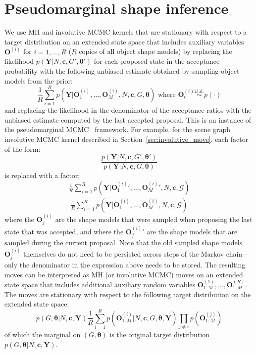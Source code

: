\section{Pseudomarginal shape inference}
\label{sec:pseudomarginal}

We use MH and involutive MCMC kernels that are stationary with respect to a target distribution on an extended state space that includes auxiliary variables $\mathbf{O}^{(i)}$ for $i = 1, \ldots, R$ ($R$ copies of all object shape models) by replacing the likelihood $p(\mathbf{Y} | N, \mathbf{c}, G', \bm{\theta}')$ for each proposed state in the acceptance probability with the following unbiased estimate obtained by sampling object models from the prior:
\begin{equation}
\frac{1}{R} \sum_{i=1}^R p(\mathbf{Y} | \mathbf{O}_1^{(i)}, \ldots, \mathbf{O}_M^{(i)}, N, \mathbf{c}, G, \bm\theta) \mbox{ where } \mathbf{O}_c^{(i)} \stackrel{\mathrm{i.i.d.}}{\sim} p(\cdot)
\end{equation}
and replacing the likelihood in the denominator of the acceptance ratios with the unbiased estimate computed by the last accepted proposal.
This is an instance of the pseudomarginal MCMC~\citep{andrieu2009pseudo} framework.
For example, for the scene graph involutive MCMC kernel described in Section~\ref{sec:involutive_move}, each factor of the form:
\begin{equation}
\frac{p(\mathbf{Y} | N, \mathbf{c}, G', \bm\theta')}{p(\mathbf{Y} | N, \mathbf{c}, G, \bm\theta)}
\end{equation}
is replaced with a factor:
\begin{equation}
\frac{
\frac{1}{R} \sum_{i=1}^R p(\mathbf{Y} | {\mathbf{O}_1^{(i)}}', \ldots, {\mathbf{O}_M^{(i)}}', N, \mathbf{c}, \mathcal{G})
}{
\frac{1}{R} \sum_{i=1}^R p(\mathbf{Y} | \mathbf{O}_1^{(i)}, \ldots, \mathbf{O}_M^{(i)}, N, \mathbf{c}, \mathcal{G})
}
\end{equation}
where the $\mathbf{O}_j^{(i)}$ are the shape models that were sampled when proposing the last state that was accepted, and where the ${\mathbf{O}_j^{(i)}}'$ are the shape models that are sampled during the current proposal.
Note that the old sampled shape models $\mathbf{O}_j^{(i)}$ themselves do not need to be persisted across steps of the Markov chain---only the denominator in the expression above needs to be stored.
The resulting moves can be interpreted as MH (or involutive MCMC) moves on an extended state space
that includes additional auxiliary random variables $\mathbf{O}_{1:M}^{(1)}, \ldots, \mathbf{O}_{1:M}^{(R)}$.
The moves are stationary with respect to the following target distribution on the extended state space:
\begin{equation}
p(G, \bm\theta | N, \mathbf{c}, \mathbf{Y}) \frac{1}{R} \sum_{i=1}^R p(\mathbf{O}_{1:M}^{(i)} | N, \mathbf{c}, G, \bm\theta, \mathbf{Y}) \prod_{j \ne i} p(\mathbf{O}_{1:M}^{(j)})
\end{equation}
of which the marginal on $(G, \bm\theta)$ is the original target distribution $p(G, \bm\theta | N, \mathbf{c}, \mathbf{Y})$.
